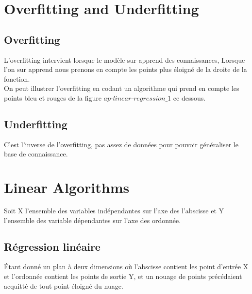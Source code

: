 \chapter{Overfitting and Underfitting}
\section{Overfitting}
L'overfitting intervient lorsque le modèle sur apprend des connaissances,
Lorsque l'on sur apprend nous prenons en compte les points plus éloigné de la droite de la fonction.\\
On peut illustrer l'overfitting en codant un algorithme qui prend en compte les points bleu et rouges de la figure $\textit{ap-linear-regression\_1}$ ce dessous.\\

\section{Underfitting}
C'est l'inverse de l'overfitting, pas assez de données pour pouvoir généraliser le base de connaissance.\\
\pagebreak
\chapter{Linear Algorithms}

Soit X l'ensemble des variables indépendantes sur l'axe des l'abscisse et
Y l'ensemble des variable dépendantes sur l'axe des ordonnée.

\section{Régression linéaire}
Étant donné un plan à deux dimensions où l'abscisse contient les point d'entrée X et l'ordonnée contient les points de sortie Y, et un nouage de points précédaient acquitté de tout point éloigné du nuage.

